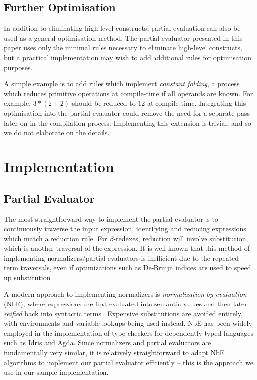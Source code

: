 \documentclass[runningheads]{llncs}
\begin{document}
\subsection{Further Optimisation}

In addition to eliminating high-level constructs, partial evaluation can also be used as a general optimisation method. The partial evaluator presented in this paper uses only the minimal rules necessary to eliminate high-level constructs, but a practical implementation may wish to add additional rules for optimisation purposes.

A simple example is to add rules which implement \emph{constant folding}, a process which reduces primitive operations at compile-time if all operands are known. For example, $3 * (2 + 2)$ should be reduced to $12$ at compile-time. Integrating this optimisation into the partial evaluator could remove the need for a separate pass later on in the compilation process. Implementing this extension is trivial, and so we do not elaborate on the details.


\section{Implementation}


\subsection{Partial Evaluator}

The most straightforward way to implement the partial evaluator is to continuously traverse the input expression, identifying and reducing expressions which match a reduction rule. For $\beta$-redexes, reduction will involve substitution, which is another traversal of the expression. It is well-known that this method of implementing normalizers/partial evaluators is inefficient due to the repeated term traversals, even if optimizations such as De-Bruijn indices \cite{berghofer2007head} are used to speed up substitution.

A modern approach to implementing normalizers is \emph{normalization by evaluation} (NbE), where expressions are first evaluated into semantic values and then later \emph{reified} back into syntactic terms \cite{abel2014normalization, berger1998normalization}. Expensive substitutions are avoided entirely, with environments and variable lookups being used instead. NbE has been widely employed in the implementation of type checkers for dependently typed languages such as Idris and Agda. Since normalizers and partial evaluators are fundamentally very similar, it is relatively straightforward to adapt NbE algorithms to implement our partial evaluator efficiently -- this is the approach we use in our sample implementation.  
\end{document}

